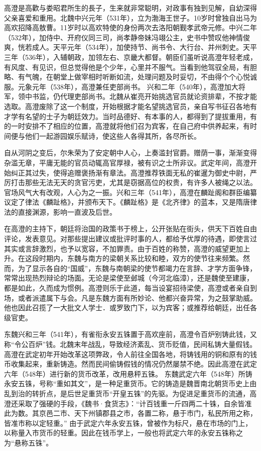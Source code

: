 高澄是高歡与娄昭君所生的長子，生来就非常聪明，对政事有独到见解，自幼深得父亲喜爱和重用。北魏中兴元年（531年），立为渤海王世子。10岁时曾独自出马为高欢招降高敖曹。11岁时以高欢特使的身份两次去洛阳朝觐孝武帝元修。中兴二年（532年），加侍中、开府仪同三司，尚孝静帝妹冯翊公主，史书中赞叹他神情俊爽，恍若成人。天平元年（534年），加使持节、尚书令、大行台、并州刺史。天平三年（536年），入辅朝政，加领左右、京畿大都督。朝臣们虽听说高澄年轻老成，有风度、有见识，但总觉得他是个少年，心里并不服气。当看到他驾驭全局，有胆略、有气魄，在朝堂上做宰相时听断如流，处理问题及时妥切，不由得个个心悦诚服。元象元年（538年），高澄兼任吏部尚书。 兴和二年（540年），高澄加大将军，领中书监，仍代理吏部尚书。北魏从崔亮开始挑选官员就论资排辈，不按才能选取。高澄废除了这一个制度，开始根据才能名望挑选官员，亲自写书征召各地有才学有名望的士子为朝廷效力。当时品德好、有本事的人，都得到了提拔重用，有的一时安排不了相应的位置，高澄就将他们召为宾客，在自己府中供养起来，有时间便与他们一起游园娱乐赋诗，使这些人各得其所，各尽所长。

自从河阴之变后，尔朱荣为了安定朝中人心，上奏滥封官爵。赠荫一事，渐渐变得杂滥无章，平庸无能的官员动辄高官厚禄，被有识之士所非议。武定年间，高澄开始纠正其过失，使得追赠褒扬渐有章法。高澄推荐铁面无私的崔暹为御史中尉，严厉打击那些无法无天的贪官污吏，尤其是窃据高位的权贵，有许多人被绳之以法。官场风气大有改观，人心为之一振。兴和三年（541年），高澄在麟趾阁和群臣编纂议定了律法《麟趾格》，并颁布天下。《麟趾格》是《北齐律》的蓝本，又是隋唐律法的直接渊源，影响一直波及后世。

在高澄的主持下，朝廷将治国的政策书于榜上，公开张贴在街头，供天下百姓自由评论，发表意见。对那些提出建议或批评时事的人，都给予优厚的待遇，即使言过其实或言辞激烈，也予以宽容，不加罪责。由于百姓的称赞，高澄的威望更加上升。在这段时期内，东魏与南方的梁朝关系比较和睦，双方的使节往来频繁。然而，为了显示各自的“国威”，东魏与南朝梁的使节都竭力在言辞、才学方面争锋，常常出现热烈辩论的场面。无论是梁使至邺城（今河北临漳），还是魏使至建康，都是如此，久而成为惯例。高澄则乐于此道，每当设宴招待梁使，高澄或者亲自到场，或者派遣属下与会。凡是东魏方面有所妙论、他都兴奋异常，为之鼓掌助威。他也因此召揽了一大批文人学士．或罗致门下，以为宾客；或推荐给朝廷，出任各级官吏。

东魏兴和三年（541年），有雀衔永安五铢置于高欢座前，高澄令百炉别铸此钱，又称“令公百炉”钱。北魏末年战乱，导致经济紊乱、货币贬值，民间私铸大量假钱。高澄在武定初年开始改革这项弊政，令人前往全国各地，将铸钱用的铜和原有的钱币收集起来，重新铸造。然而民间偷铸假钱的情况仍然屡禁不绝。因此高澄在武定六年（548年）进行新的货币改革，改用悬秤五铢。 东魏武定六年（548年）所铸永安五铢，号称“重如其文”，是一种足重货币。它的铸造是魏晋南北朝货币史上由乱到治的转折点，是后世足重货币“开皇五铢”的先驱。为促进足重货币的流通，高澄还采取了强硬的手段，《魏书·食货志》：“计百钱重一斤四两二十铢，自余皆准此为数。其京邑二市、天下州镇郡县之市，各置二称，悬于市门，私民所用之称，皆准市称以定轻重。” 由于武定六年永安五铢，曾被作为标尺，悬在市场的门上，以称量入市货币的轻重。因此在钱币学上，一般也将武定六年的永安五铢称之为“悬称五铢”。

